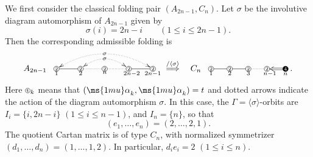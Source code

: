 \documentclass[12pt, leqno]{amsart}
\numberwithin{equation}{section}
\theoremstyle{plain}
\theoremstyle{definition}
\renewcommand{\le}{\leqslant}
\newcommand{\al}{{\ms{1mu}\alpha}}
\newcommand*\circled[1]{ \fontsize{6}{6}\selectfont \tikz[baseline=(char.base)]{
  \node[shape=circle,draw,inner sep=0.4pt] (char) {#1};} \fontsize{12}{12}\selectfont }
\newcommand*\bcircled[1]{\fontsize{6}{6}\selectfont \tikz[baseline=(char.base)]{
    \node[shape=circle, fill= black, draw=black, text=white,  inner sep=0.4pt] (char) {#1};} \fontsize{12}{12}\selectfont}
\newcommand{\ang}[1]{\langle#1\rangle}
\begin{document}
We first consider the classical folding pair
$(A_{2n-1},C_n)$.
Let $\sigma$ be the involutive diagram automorphism of $A_{2n-1}$ given by
\[
\sigma(i)=2n-i \qquad (1\le i\le 2n-1).
\]
Then the corresponding admissible folding is
\begin{align}
A_{2n-1} \ \ \xymatrix@R=0.5ex@C=5ex{ *{\circled{2}}<3pt> \ar@{-}[r]_<{ 1 \ \  } \ar@/^1.5pc/@{<.>}[rrrr]|{\sigma}
& *{\circled{2}}<3pt> \ar@{.}[r]_<{ 2 \ \  } \ar@/^1pc/@{<.>}[rr]|{\sigma}
& *{\circled{2}}<3pt> \ar@{}[r]_<{ n  \ \ } \ar@{.}[r]
&*{\circled{2}}<3pt> \ar@{-}[r]_>{ \ \ 2n-1} &*{\circled{2}}<3pt> \ar@{}[l]^>{   2n-2} }
\overset{/\ang{\sigma}}{\Longrightarrow}
\quad
C_{n} \ \  \xymatrix@R=0.5ex@C=3.5ex{ *{\circled{2}}<3pt> \ar@{-}[r]_<{ 1 \ \  } & *{\circled{2}}<3pt> \ar@{-}[r]_<{ 2 \ \  } & *{\circled{2}}<3pt> \ar@{.}[r]_<{ 3  \ \  }
&*{\circled{2}}<3pt> \ar@{<=}[r]_>{ \ \ \raisebox{-0.16cm}{\scriptsize $n$}} &*{\bcircled{4}}<3pt> \ar@{}[l]^>{   n-1} }.
\end{align}
Here $ \xymatrix@R=0.5ex@C=3.5ex{    *{\circled{t}}<3pt>}_k$ means that $(\al_k,\al_k)=t$ and dotted arrows indicate the action of the
diagram automorphism $\sigma$. In this case, the $\Gamma=\ang{\sigma}$-orbits are
$I_i=\{i,2n-i\}$ $(1\le i\le n-1)$,
and  $I_n=\{n\}$,
so that
\[
(e_1,\ldots,e_n)=(2,\ldots,2,1).
\]
The quotient Cartan matrix is of type $C_n$, with normalized symmetrizer
$(d_1,\ldots,d_n)=(1,\ldots,1,2)$.
In particular, $d_i e_i=2$ $(1\le i\le n)$.
\end{document}
